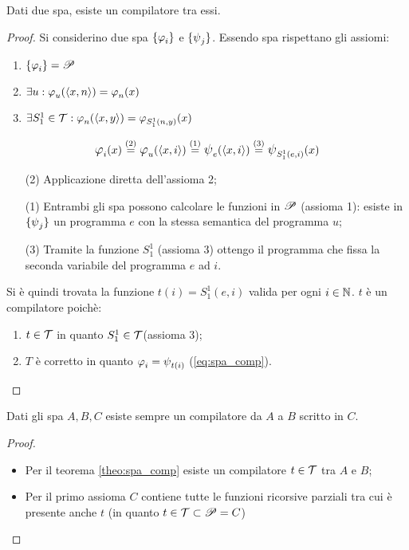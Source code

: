 \begin{theorem}\label{theo:spa_comp}
    Dati due spa, esiste un compilatore tra essi.
\end{theorem}
\begin{proof}
    Si considerino due spa $\sistProg$ e $\sistProgW$. Essendo spa rispettano gli
    assiomi:
    \begin{enumerate}
        \item $\sistProg=\ricPar$
        \item $\exists u: \semRAM_u(\cantor{x,n})=
            \semRAM_n(x)$
        \item $\exists S_1^1\in\ricTot:\semRAM_n(\cantor{x,y})=
            \semRAM_{S_1^1(n,y)}(x)$
    \end{enumerate}

    \begin{equation}\label{eq:spa_comp}
        \semRAM_i(x)\overset{(2)}{=} 
        \semRAM_u(\cantor{x,i})\overset{(1)}{=}
        \semWHILE_e(\cantor{x,i})\overset{(3)}{=}
        \semWHILE_{S_1^1(e,i)}(x)
    \end{equation}
    \vspace{-.5em}

    \begin{enumerate}
        \item[(2)] Applicazione diretta dell'assioma 2;
        \item[(1)] Entrambi gli spa possono calcolare le funzioni in $\mathscr{P}$
            (assioma 1): esiste in $\sistProgW$ un programma $e$ con la stessa semantica
            del programma $u$;
        \item[(3)] Tramite la funzione $S_1^1$ (assioma 3) ottengo il programma che fissa
            la seconda variabile del programma $e$ ad $i$.
    \end{enumerate}

    Si è quindi trovata la funzione $t(i)=S_1^1(e,i)$ valida per ogni $i\in\mathbb{N}$.
    $t$ è un compilatore poichè:
    \begin{enumerate}
        \item $t\in\mathcal{T}$ in quanto $S_1^1\in\mathcal{T}$(assioma 3);
        \item $T$ è corretto in quanto $\semRAM_i=\semWHILE_{t(i)}$
         (\ref{eq:spa_comp}).
    \end{enumerate}
\end{proof}
\begin{corollario}
    Dati gli spa $A,B,C$ esiste sempre un compilatore da $A$ a $B$ scritto
    in $C$. 
\end{corollario}
\begin{proof}\phantom{x}
    \begin{itemize}
        \item Per il teorema \ref{theo:spa_comp} esiste un compilatore $t\in\mathcal{T}$
            tra $A$ e $B$;
        \item Per il primo assioma $C$ contiene tutte le funzioni ricorsive parziali
            tra cui è presente anche $t$ (in quanto $t\in\mathcal{T}\subset\mathscr{P}=C$)
    \end{itemize}
\end{proof}

